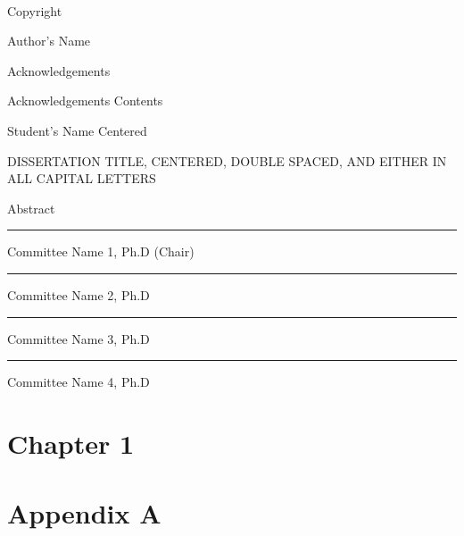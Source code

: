 \documentclass[12pt,letterpaper]{report}
\begin{document}
\newpage
\
\vspace{1cm}
\vfil
\begin{center}
{\large Copyright \par}
{\large Author's Name}
\end{center}
\vfil

\newpage
\begin{center}
\vspace*{1cm}
{\LARGE Acknowledgements}
\end{center}
Acknowledgements Contents
\newpage
\vspace*{1cm}
\begin{center}
{\large Student's Name Centered\par}
\vspace{1cm}
\uppercase{{\large DISSERTATION TITLE, CENTERED, DOUBLE SPACED, AND EITHER IN ALL CAPITAL LETTERS}}
\end{center}
\vspace{1cm}
{
Abstract\hfill
}
\begin{center}
\singlespacing
\vspace{3cm}
{\hfill \noindent\rule{8cm}{0.4pt} \par}
{\large \hfill Committee Name 1, Ph.D (Chair)}
\vspace{1cm}
\\
{\hfill \noindent\rule{8cm}{0.4pt} \par}
{\large \hfill Committee Name 2, Ph.D}
\vspace{1cm}
\\
{\hfill \noindent\rule{8cm}{0.4pt} \par}
{\large \hfill Committee Name 3, Ph.D}
\vspace{1cm}
\\
{\hfill \noindent\rule{8cm}{0.4pt} \par}
{\large \hfill Committee Name 4, Ph.D}
\vspace{2cm}
\end{center}
\newpage
\thispagestyle{empty}

\doublespacing
\tableofcontents
\listoffigures
\listoftables

\newpage
{}
\chapter{Chapter 1}
\label{chap:1}


\newpage
\clearpage
\appendix
\chapter{Appendix A}
\label{sec:App_A}


\cleardoublepage
{}



\end{document}

